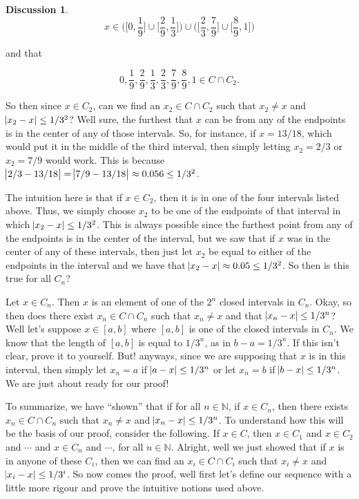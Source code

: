 \documentclass{article}
\theoremstyle{definition}
\theoremstyle{remark}
\theoremstyle{definition}
\newtheorem*{discussion}{Discussion}
\begin{document}
\begin{discussion}
    \begin{equation*}
        x\in\bigg(\bigg[0,\frac{1}{9}\bigg]\cup\bigg[\frac{2}{9},\frac{1}{3}\bigg]\bigg)\cup\bigg(\bigg[\frac{2}{3}, \frac{7}{9}\bigg]\cup\bigg[\frac{8}{9},1\bigg]\bigg)
    \end{equation*}
    
    \noindent and that 
    
    \begin{equation*}
        0,\frac{1}{9},\frac{2}{9},\frac{1}{3},\frac{2}{3},\frac{7}{9},\frac{8}{9},1\in C\cap C_2.
    \end{equation*}
    
    \noindent So then since $x\in C_2$, can we find an $x_2\in C\cap C_2$ such that $x_2\neq x$ and $\abs{x_2-x}\leq 1/3^2$? Well sure, the furthest that $x$ can be from any of the endpoints is in the center of any of those intervals. So, for instance, if $x=13/18$, which would put it in the middle of the third interval, then simply letting $x_2=2/3$ or $x_2=7/9$ would work. This is because $\abs{2/3-13/18}=\abs{7/9-13/18}\approx 0.056\leq1/3^2$.\par 
    The intuition here is that if $x\in C_2$, then it is in one of the four intervals listed above. Thus, we simply choose $x_2$ to be one of the endpoints of that interval in which $\abs{x_2-x}\leq1/3^2$. This is always possible since the furthest point from any of the endpoints is in the center of the interval, but we saw that if $x$ was in the center of any of these intervals, then just let $x_2$ be equal to either of the endpoints in the interval and we have that $\abs{x_2-x}\approx0.05\leq1/3^2$. So then is this true for all $C_n$?\par 
    Let $x\in C_n$. Then $x$ is an element of one of the $2^n$ closed intervals in $C_n$. Okay, so then does there exist $x_n\in C\cap C_n$ such that $x_n\neq x$ and  that $\abs{x_n-x}\leq 1/3^n$? Well let's suppose $x\in[a,b]$ where $[a,b]$ is one of the closed intervals in $C_n$. We know that the length of $[a,b]$ is equal to $1/3^n$, as in $b-a=1/3^n$. If this isn't clear, prove it to yourself. But! anyways, since we are supposing that $x$ is in this interval, then simply let $x_n=a$ if $\abs{a-x}\leq 1/3^n$ or let $x_n=b$ if $\abs{b-x}\leq 1/3^n$. We are just about ready for our proof! \par 
    To summarize, we have ``shown'' that if for all $n\in\mathbb{N}$, if $x\in C_n$, then there exists $x_n\in C\cap C_n$ such that $x_n\neq x$ and $\abs{x_n-x}\leq 1/3^n$. To understand how this will be the basis of our proof, consider the following. If $x\in C$, then $x\in C_1$ and $x\in C_2$ and $\cdots$ and $x\in C_n$ and $\cdots$, for all $n\in \mathbb{N}$. Alright, well we just showed that if $x$ is in anyone of these $C_i$, then we can find an $x_i\in C\cap C_i$ such that $x_i\neq x$ and $\abs{x_i-x}\leq 1/3^i$. So now comes the proof, well first let's define our sequence with a little more rigour and prove the intuitive notions used above.
    
\end{discussion}
    
\end{document}
